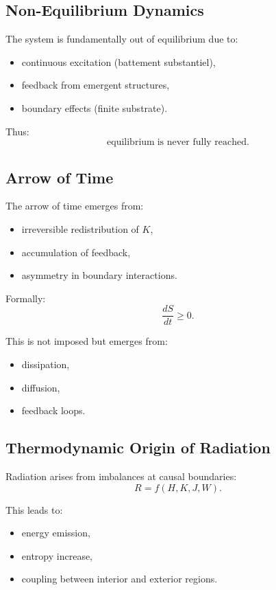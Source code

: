 \documentclass[11pt]{article}
\begin{document}
\subsection{Non-Equilibrium Dynamics}

The system is fundamentally out of equilibrium due to:
\begin{itemize}
\item continuous excitation (battement substantiel),
\item feedback from emergent structures,
\item boundary effects (finite substrate).
\end{itemize}

Thus:
\begin{equation}
\text{equilibrium} \;\text{is never fully reached}.
\end{equation}

\subsection{Arrow of Time}

The arrow of time emerges from:
\begin{itemize}
\item irreversible redistribution of $K$,
\item accumulation of feedback,
\item asymmetry in boundary interactions.
\end{itemize}

Formally:
\begin{equation}
\frac{dS}{dt} \ge 0.
\end{equation}

This is not imposed but emerges from:
\begin{itemize}
\item dissipation,
\item diffusion,
\item feedback loops.
\end{itemize}

\subsection{Thermodynamic Origin of Radiation}

Radiation arises from imbalances at causal boundaries:
\begin{equation}
R = f(H, K, J, W).
\end{equation}

This leads to:
\begin{itemize}
\item energy emission,
\item entropy increase,
\item coupling between interior and exterior regions.
\end{itemize}
\end{document}
